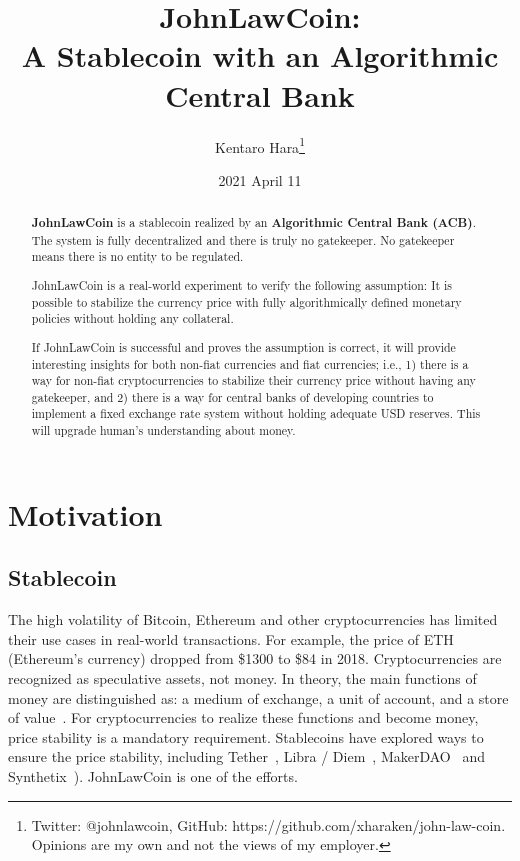 \documentclass[dvipdfmx,a4paper]{article}
\title{\textbf{JohnLawCoin:\\A Stablecoin with an Algorithmic Central Bank}}
\author{Kentaro Hara\footnote{Twitter: @johnlawcoin, GitHub: https://github.com/xharaken/john-law-coin. Opinions are my own and not the views of my employer.}}
\date{2021 April 11}
\begin{document}
\maketitle

\begin{abstract}

\textbf{JohnLawCoin} is a stablecoin realized by an \textbf{Algorithmic Central Bank (ACB)}. The system is fully decentralized and there is truly no gatekeeper. No gatekeeper means there is no entity to be regulated.

JohnLawCoin is a real-world experiment to verify the following assumption: It is possible to stabilize the currency price with fully algorithmically defined monetary policies without holding any collateral.

If JohnLawCoin is successful and proves the assumption is correct, it will provide interesting insights for both non-fiat currencies and fiat currencies; i.e., 1) there is a way for non-fiat cryptocurrencies to stabilize their currency price without having any gatekeeper, and 2) there is a way for central banks of developing countries to implement a fixed exchange rate system without holding adequate USD reserves. This will upgrade human's understanding about money.

\end{abstract}

\section{Motivation}

\subsection{Stablecoin}

The high volatility of Bitcoin, Ethereum and other cryptocurrencies has limited their use cases in real-world transactions. For example, the price of ETH (Ethereum's currency) dropped from \$1300 to \$84 in 2018. Cryptocurrencies are recognized as speculative assets, not money. In theory, the main functions of money are distinguished as: a medium of exchange, a unit of account, and a store of value~\cite{davies2010history,ferguson2008ascent}. For cryptocurrencies to realize these functions and become money, price stability is a mandatory requirement. Stablecoins have explored ways to ensure the price stability, including Tether~\cite{tether}, Libra / Diem~\cite{libra}, MakerDAO~\cite{makerdao} and Synthetix~\cite{synthetix}). JohnLawCoin is one of the efforts.
\end{document}

